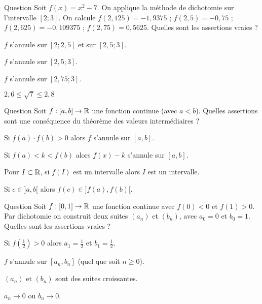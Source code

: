 \begin{multi}[multiple,feedback=
{La fonctions \(f\) est continue, strictement croissante et s'annule en \(\sqrt{7}\). 
Comme \(f(2,625) < 0\) et \(f(2,75) > 0\), alors
\(2,625 < \sqrt{7} < 2,75\).
}]{Question}
Soit \(f(x)=x^2-7\). On applique la méthode de dichotomie sur l'intervalle \([2 ; 3]\). 
On calcule \(f(2,125)=-1,9375\) ; \(f(2,5) = -0,75\) ; \(f(2,625) = -0,109375\) ; \(f(2,75) = 0,5625\). Quelles sont les assertions vraies ?

    \item \(f\) s'annule sur \([2 ; 2,5]\) et sur \([2,5 ; 3]\).
    \item* \(f\) s'annule sur \([2,5 ; 3]\).
    \item \(f\) s'annule sur \([2,75 ; 3]\).
    \item* \(2,6 \le \sqrt{7} \le 2,8\)
\end{multi}


\begin{multi}[multiple,feedback=
{Les trois fa\c{c}ons d'énoncer le théorème des valeurs intermédiaires, pour \(f : [a,b] \to \Rr\) continue :
(1) si \(f(a) \cdot f(b) \le 0\) alors \(f\) s'annule sur \([a,b]\) ;
(2) si \(f(a) < k < f(b)\) alors il existe \(a < c < b\) tel que \(f(c)=k\) ;
(3) si \(I\) est un intervalle, alors \(f(I)\) est un intervalle.
}]{Question}
Soit \(f : [a,b] \to \Rr\) une fonction continue (avec \(a < b\)). Quelles assertions sont une conséquence du théorème des valeurs intermédiaires ?

    \item Si \(f(a) \cdot f(b) > 0\) alors \(f\) s'annule sur \([a,b]\).
    \item* Si \(f(a) < k < f(b)\) alors \(f(x)-k\) s'annule sur \([a,b]\).
    \item Pour \(I \subset \mathbb{R}\), si \(f(I)\) est un intervalle alors \(I\) est un intervalle.
    \item Si \(c \in ]a,b[\) alors \(f(c) \in ]f(a),f(b)[\).
\end{multi}


\begin{multi}{Question}
Soit \(f : [0,1] \to \mathbb{R}\) une fonction continue avec \(f(0)<0\) et \(f(1)>0\).
Par dichotomie on construit deux suites \((a_n)\) et \((b_n)\), avec \(a_0 = 0\) et \(b_0 = 1\). Quelles sont les assertions vraies ?

    \item Si \(f(\frac12)>0\) alors \(a_1 = \frac12\) et \(b_1 = \frac12\).
    \item* \(f\) s'annule sur \([a_n,b_n]\) (quel que soit \(n\ge0\)).
    \item \((a_n)\) et \((b_n)\) sont des suites croissantes.
    \item \(a_n \to 0\) ou \(b_n \to 0\).
\end{multi}


